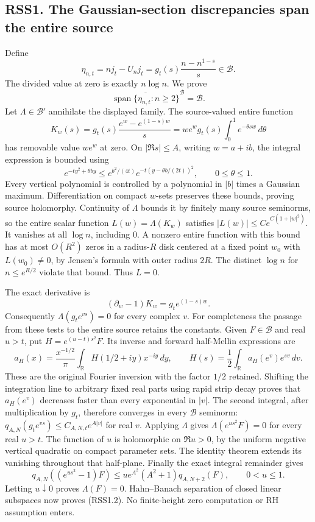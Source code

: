 \subsection{RSS1. The Gaussian-section discrepancies span the entire
source}\label{rss1.-the-gaussian-section-discrepancies-span-the-entire-source}

Define \[
\eta_{n,t}=nj_t-U_nj_t
=g_t(s)\frac{n-n^{1-s}}s\in\mathcal B.
\tag{RSS1.1}
\] The divided value at zero is exactly \(n\log n\). We prove \[
\boxed{\overline{\operatorname{span}\{\eta_{n,t}:n\ge2\}}^{\mathcal B}=\mathcal B.}
\tag{RSS1.2}
\] Let \(\Lambda\in\mathcal B'\) annihilate the displayed family. The
source-valued entire function \[
K_w(s)=g_t(s)\frac{e^w-e^{(1-s)w}}s
=we^w g_t(s)\int_0^1 e^{-\theta sw}\,d\theta
\tag{RSS1.3}
\] has removable value \(we^w\) at zero. On \(|\Re s|\le A\), writing
\(w=a+ib\), the integral expression is bounded using \[
e^{-ty^2+\theta by}\le
e^{b^2/(4t)}e^{-t(y-\theta b/(2t))^2},\qquad0\le\theta\le1.
\tag{RSS1.4}
\] Every vertical polynomial is controlled by a polynomial in \(|b|\)
times a Gaussian maximum. Differentiation on compact \(w\)-sets
preserves these bounds, proving source holomorphy. Continuity of
\(\Lambda\) bounds it by finitely many source seminorms, so the entire
scalar function \(L(w)=\Lambda(K_w)\) satisfies
\(|L(w)|\le C e^{C(1+|w|^2)}\). It vanishes at all \(\log n\), including
\(0\). A nonzero entire function with this bound has at most \(O(R^2)\)
zeros in a radius-\(R\) disk centered at a fixed point \(w_0\) with
\(L(w_0)\ne0\), by Jensen's formula with outer radius \(2R\). The
distinct \(\log n\) for \(n\le e^{R/2}\) violate that bound. Thus
\(L=0\).

The exact derivative is \[
(\partial_w-1)K_w=g_te^{(1-s)w}.
\tag{RSS1.5}
\] Consequently \(\Lambda(g_te^{vs})=0\) for every complex \(v\). For
completeness the passage from these tests to the entire source retains
the constants. Given \(F\in\mathcal B\) and real \(u>t\), put
\(H=e^{(u-t)s^2}F\). Its inverse and forward half-Mellin expressions are
\[
a_H(x)=\frac{x^{-1/2}}\pi\int_{\mathbb R}H(1/2+iy)x^{-iy}\,dy,
\qquad H(s)=\frac12\int_{\mathbb R}a_H(e^v)e^{sv}\,dv.
\tag{RSS1.6}
\] These are the original Fourier inversion with the factor \(1/2\)
retained. Shifting the integration line to arbitrary fixed real parts
using rapid strip decay proves that \(a_H(e^v)\) decreases faster than
every exponential in \(|v|\). The second integral, after multiplication
by \(g_t\), therefore converges in every \(\mathcal B\) seminorm:
\(q_{A,N}(g_te^{vs})\le C_{A,N,t}e^{A|v|}\) for real \(v\). Applying
\(\Lambda\) gives \(\Lambda(e^{us^2}F)=0\) for every real \(u>t\). The
function of \(u\) is holomorphic on \(\Re u>0\), by the uniform negative
vertical quadratic on compact parameter sets. The identity theorem
extends its vanishing throughout that half-plane. Finally the exact
integral remainder gives \[
q_{A,N}((e^{us^2}-1)F)
\le u e^{A^2}(A^2+1)q_{A,N+2}(F),\qquad0<u\le1.
\tag{RSS1.7}
\] Letting \(u\downarrow0\) proves \(\Lambda(F)=0\). Hahn--Banach
separation of closed linear subspaces now proves (RSS1.2). No
finite-height zero computation or RH assumption enters.

